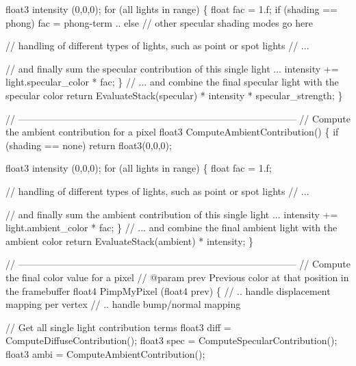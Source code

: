 \begin{DoxyCode}
  float3 intensity (0,0,0);
  \textcolor{keywordflow}{for} (all lights in range)
  \{
    \textcolor{keywordtype}{float} fac = 1.f;
    \textcolor{keywordflow}{if} (shading == phong)
      fac =  phong-term ..
    \textcolor{keywordflow}{else} \textcolor{comment}{// other specular shading modes go here}

    \textcolor{comment}{// handling of different types of lights, such as point or spot lights}
    \textcolor{comment}{// ...}

    \textcolor{comment}{// and finally sum the specular contribution of this single light ...}
    intensity += light.specular\_color * fac;
  \}
  \textcolor{comment}{// ... and combine the final specular light with the specular color}
  \textcolor{keywordflow}{return} EvaluateStack(specular) * intensity * specular\_strength;
\}

\textcolor{comment}{// ---------------------------------------------------------------------------------------}
\textcolor{comment}{// Compute the ambient contribution for a pixel}
float3 ComputeAmbientContribution()
\{
  \textcolor{keywordflow}{if} (shading == none)
     \textcolor{keywordflow}{return} float3(0,0,0);

  float3 intensity (0,0,0);
  \textcolor{keywordflow}{for} (all lights in range)
  \{
    \textcolor{keywordtype}{float} fac = 1.f;

    \textcolor{comment}{// handling of different types of lights, such as point or spot lights}
    \textcolor{comment}{// ...}

    \textcolor{comment}{// and finally sum the ambient contribution of this single light ...}
    intensity += light.ambient\_color * fac;
  \}
  \textcolor{comment}{// ... and combine the final ambient light with the ambient color}
  \textcolor{keywordflow}{return} EvaluateStack(ambient) * intensity;
\}

\textcolor{comment}{// ---------------------------------------------------------------------------------------}
\textcolor{comment}{// Compute the final color value for a pixel}
\textcolor{comment}{// @param prev Previous color at that position in the framebuffer}
float4 PimpMyPixel (float4 prev)
\{
  \textcolor{comment}{// .. handle displacement mapping per vertex}
  \textcolor{comment}{// .. handle bump/normal mapping}

  \textcolor{comment}{// Get all single light contribution terms}
  float3 diff = ComputeDiffuseContribution();
  float3 spec = ComputeSpecularContribution(); 
  float3 ambi = ComputeAmbientContribution();


\end{DoxyCode}
